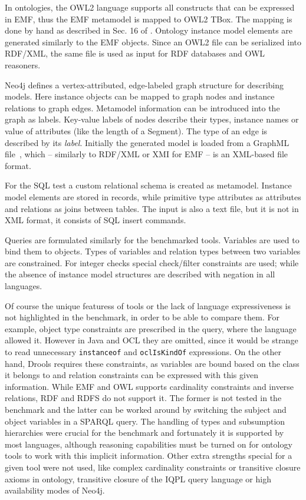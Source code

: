 In ontologies, the OWL2 language supports all constructs that can be expressed in
EMF, thus the EMF metamodel is mapped to OWL2 TBox. The mapping is done by hand as
described in Sec. 16 of \cite{OMG2009ODM}. Ontology instance model elements are
generated similarly to the EMF objects. Since an OWL2 file can be serialized
into RDF/XML, the same file is used as input for RDF databases and OWL
reasoners.

Neo4j defines a vertex-attributed, edge-labeled graph structure for describing
models. Here instance objects can be mapped to graph nodes and instance
relations to graph edges. Metamodel information can be introduced into the graph
as labels. Key-value labels of nodes describe their types, instance names or
value of attributes (like the length of a Segment). The type of an edge is described by its \emph{label}.
Initially the generated model is loaded from a GraphML file~\cite{GraphML},
which -- similarly to RDF/XML or XMI for EMF -- is an XML-based file format.

For the SQL test a custom relational schema is created as metamodel. Instance
model elements are stored in records, while primitive type attributes as
attributes and relations as joins between tables. The input is also a text
file, but it is not in XML format, it consists of SQL insert commands.

Queries are formulated similarly for the benchmarked tools. Variables are used
to bind them to objects. Types of variables and relation types between two
variables are constrained. For integer checks special check/filter constraints
are used; while the absence of instance model structures are described with
negation in all languages.


Of course the unique featuress of tools or the lack of language expressiveness is not
highlighted in the benchmark, in order to be able to compare them. For example,
object type constraints are prescribed in the query, where the language allowed it.
However in Java and OCL they are omitted, since it would be strange to read
unnecessary \texttt{instanceof} and \texttt{oclIsKindOf} expressions. On the other
hand, Drools requires these constraints, as variables are bound based on the
class it belongs to and relation constraints can be expressed with this given
information. While EMF and OWL supports cardinality constraints and inverse
relations, RDF and RDFS do not support it. The former is not tested in the
benchmark and the latter can be worked around by switching the subject and
object variables in a SPARQL query.
The handling of types and subsumption hierarchies were crucial for the
benchmark and fortunately it is supported by most languages, although
reasoning capabilities must be turned on for ontology tools to work with this
implicit information. Other extra strengths special for a given tool were not
used, like complex cardinality constraints or transitive closure axioms in
ontology, transitive closure of the IQPL query language or high availability
modes of Neo4j.

